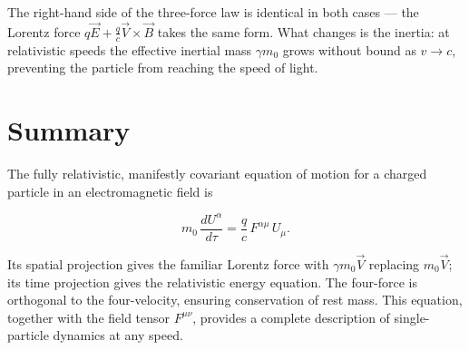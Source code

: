 The right-hand side of the three-force law is identical in both cases --- the Lorentz force $q\vec{E} + \frac{q}{c}\vec{V}\times\vec{B}$ takes the same form. What changes is the inertia: at relativistic speeds the effective inertial mass $\gamma m_0$ grows without bound as $v \to c$, preventing the particle from reaching the speed of light.

\section{Summary}

The fully relativistic, manifestly covariant equation of motion for a charged particle in an electromagnetic field is

\begin{equation}
m_0\,\frac{dU^\alpha}{d\tau} = \frac{q}{c}\,F^{\alpha\mu}\,U_\mu.
\end{equation}

Its spatial projection gives the familiar Lorentz force with $\gamma m_0\vec{V}$ replacing $m_0\vec{V}$; its time projection gives the relativistic energy equation. The four-force is orthogonal to the four-velocity, ensuring conservation of rest mass. This equation, together with the field tensor $F^{\mu\nu}$, provides a complete description of single-particle dynamics at any speed.
